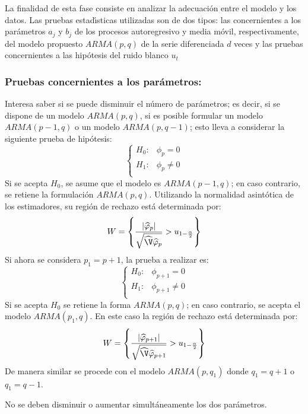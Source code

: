 La finalidad de esta fase consiste en analizar la adecuaci\'{o}n entre el modelo y 
los datos. Las pruebas estad\'{\i}sticas utilizadas son de dos tipos: las 
concernientes a los par\'{a}metros $a_{j}$ y $b_{j}$ de los procesos 
autoregresivo y media m\'{o}vil, respectivamente, del modelo propuesto 
$ARMA(p,q)$ de la serie diferenciada $d$ veces y las pruebas concernientes a las 
hip\'{o}tesis del ruido blanco $u_{t}$

\subsubsection{Pruebas concernientes a los par\'{a}metros:}
Interesa saber si se puede disminuir el n\'{u}mero de par\'{a}metros; es 
decir, si se dispone de un modelo $ARMA(p,q)$, si es posible formular un 
modelo $ARMA(p-1,  q)$ o un modelo $ARMA  (p,q-1)$; esto 
lleva a considerar la siguiente prueba de hip\'{o}tesis:
\[
\begin{cases}
 H_0:& \phi_{p} =0 \\ 
 H_{1} :& \phi_{p} \ne 0 \\ 
\end{cases}
\]
Si se acepta $H_{0}$, se asume que el modelo es 
$ARMA(p-1,  q)$; en caso contrario, se retiene la formulaci\'{o}n 
$ARMA(p,q)$. Utilizando la normalidad asint\'{o}tica de los estimadores, su 
regi\'{o}n de rechazo est\'{a} determinada por:
\[
W=\left\{ {\frac{\left| {\widehat{\varphi}_{p} } \right|}{\sqrt 
{\widehat{\V}\widehat{\varphi}_{p} } }>u_{1-\frac{\alpha 
}{2}} } \right\}
\]
Si ahora se considera $p_{1} = p+1$, la prueba a realizar es: 
\[
\begin{cases}
 H_0:& \phi_{p+1} =0 \\ 
 H_{1} :& \phi_{p+1} \ne 0 \\ 
\end{cases}
\]
Si se acepta $H_{0}$ se retiene la forma $ARMA (p, q)$; en caso 
contrario, se acepta el modelo $ARMA (p_{1} , q)$. En este caso la 
regi\'{o}n de rechazo est\'{a} determinada por:
\[
W=\left\{ {\frac{\left| {\widehat{\varphi}_{p+1} } \right|}{\sqrt 
{\widehat{\V}\widehat{\varphi}_{p+1} } }>u_{1-\frac{\alpha 
}{2}} } \right\}
\]
De manera similar se procede con el modelo $ARMA (p , q_{1} )$ donde $q_{1} = q + 1$ o $q_{1} = q - 1$.

\begin{observacion}
No se deben disminuir o aumentar simult\'{a}neamente los dos par\'{a}metros. 
\end{observacion}



